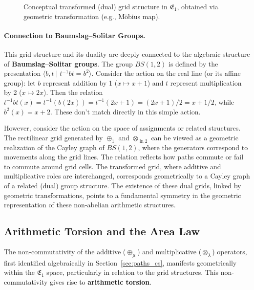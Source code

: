 \documentclass[12pt]{article}
\begin{document}
\begin{figure}[ht]
\centering
\caption{Conceptual transformed (dual) grid structure in \( \mathfrak{E}_1 \), obtained via geometric transformation (e.g., Möbius map).}
\label{fig:grid2_cs}
\end{figure}

\paragraph{Connection to Baumslag–Solitar Groups.} This grid structure and its duality are deeply connected to the algebraic structure of \textbf{Baumslag–Solitar groups}. The group \( BS(1, 2) \) is defined by the presentation \( \langle b, t \mid t^{-1} b t = b^2 \rangle \).
Consider the action on the real line (or its affine group): let \( b \) represent addition by 1 (\( x \mapsto x+1 \)) and \( t \) represent multiplication by 2 (\( x \mapsto 2x \)). Then the relation \( t^{-1} b t (x) = t^{-1}(b(2x)) = t^{-1}(2x+1) = (2x+1)/2 = x + 1/2 \), while \( b^2(x) = x+2 \). These don't match directly in this simple action.

However, consider the action on the space of assignments or related structures. The rectilinear grid generated by \( \oplus_1 \) and \( \otimes_{\ln 2} \) can be viewed as a geometric realization of the Cayley graph of \( BS(1, 2) \), where the generators correspond to movements along the grid lines. The relation reflects how paths commute or fail to commute around grid cells. The transformed grid, where additive and multiplicative roles are interchanged, corresponds geometrically to a Cayley graph of a related (dual) group structure. The existence of these dual grids, linked by geometric transformations, points to a fundamental symmetry in the geometric representation of these non-abelian arithmetic structures.

\subsection{Arithmetic Torsion and the Area Law} %

The non-commutativity of the additive (\(\oplus_\mu\)) and multiplicative (\(\otimes_\lambda\)) operators, first identified algebraically in Section~\ref{sec:paths_cs}, %
manifests geometrically within the \( \mathfrak{E}_1 \) space, particularly in relation to the grid structures. This non-commutativity gives rise to \textbf{arithmetic torsion}.
\end{document}
